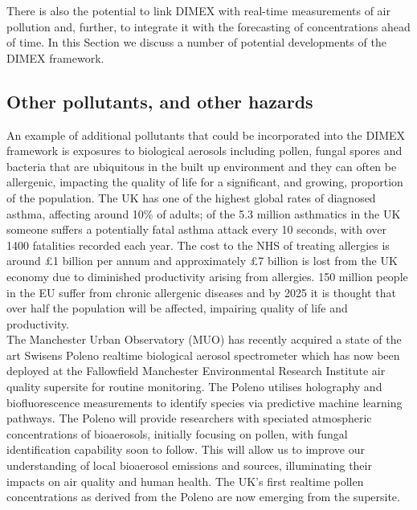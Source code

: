\documentclass{article}
\begin{document}
\noindent There is also the potential to link DIMEX with real-time measurements of air pollution and, further, to integrate it with the forecasting of concentrations ahead of time. In this Section we discuss a number of potential developments of the DIMEX framework. 

\clearpage
\subsection{Other pollutants, and other hazards }


\noindent An example of additional pollutants that could be incorporated into the DIMEX framework is exposures to biological aerosols including pollen, fungal spores and bacteria that are ubiquitous in the built up environment and they can often be allergenic, impacting the quality of life for a significant, and growing, proportion of the population. The UK has one of the highest global rates of diagnosed asthma, affecting around 10\% of adults; of the 5.3 million asthmatics in the UK someone suffers a potentially fatal asthma attack every 10 seconds, with over 1400 fatalities recorded each year. The cost to the NHS of treating allergies is around £1 billion per annum and approximately £7 billion is lost from the UK economy due to diminished productivity arising from allergies. 150 million people in the EU suffer from chronic allergenic diseases and by 2025 it is thought that over half the population will be affected, impairing quality of life and productivity.\\

\noindent The Manchester Urban Observatory (MUO) has recently acquired a state of the art Swisens Poleno realtime biological aerosol spectrometer which has now been deployed at the Fallowfield Manchester Environmental Research Institute air quality supersite for routine monitoring. The Poleno utilises holography and biofluorescence measurements to identify species via predictive machine learning pathways. The Poleno will provide researchers with speciated atmospheric concentrations of bioaerosols, initially focusing on pollen, with fungal identification capability soon to follow. This will allow us to improve our understanding of local bioaerosol emissions and sources, illuminating their impacts on air quality and human health. The UK’s first realtime pollen concentrations as derived from the Poleno are now emerging from the supersite.\\
\end{document}
